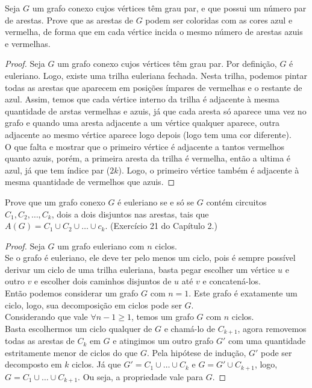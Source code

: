 \documentclass[12pt]{article}
\newenvironment{problem}[2][Ex]{\begin{trivlist}
\item[\hskip \labelsep {\bfseries #1}\hskip \labelsep {\bfseries #2.}]}{\end{trivlist}}
\begin{document}
\begin{problem}{E9}
Seja $G$ um grafo conexo cujos vértices têm grau par, e que possui um número par de arestas. Prove que as arestas de $G$ podem ser coloridas com as cores azul e vermelha, de forma que em cada vértice incida o mesmo número de arestas azuis e vermelhas.
\end{problem}

\begin{proof}
Seja $G$ um grafo conexo cujos vértices têm grau par. Por definição, $G$ é euleriano. Logo, existe uma trilha euleriana fechada. Nesta trilha, podemos pintar todas as arestas que aparecem em posições ímpares de vermelhas e o restante de azul. Assim, temos que cada vértice interno da trilha é adjacente à mesma quantidade de arstas vermelhas e azuis, já que cada aresta só aparece uma vez no grafo e quando uma aresta adjacente a um vértice qualquer aparece, outra adjacente ao mesmo vértice aparece logo depois (logo tem uma cor diferente). \\
O que falta e mostrar que o primeiro vértice é adjacente a tantos vermelhos quanto azuis, porém, a primeira aresta da trilha é vermelha, então a ultima é azul, já que tem índice par ($2k$). Logo, o primeiro vértice também é adjacente à mesma quantidade de vermelhos que azuis.
\end{proof}

\begin{problem}{E10}
Prove que um grafo conexo $G$ é euleriano se e só se $G$ contém circuitos $C_1, C_2, \dots, C_k$, dois a dois disjuntos nas arestas, tais que $A(G) = C_1 \cup C_2 \cup \dots \cup c_k$. (Exercício 21 do Capítulo 2.)
\end{problem}

\begin{proof}
Seja $G$ um grafo euleriano com $n$ ciclos. \\
Se o grafo é euleriano, ele deve ter pelo menos um ciclo, pois é sempre possível derivar um ciclo de uma trilha euleriana, basta pegar escolher um vértice $u$ e outro $v$ e escolher dois caminhos disjuntos de $u$ até $v$ e concatená-los. \\
Então podemos considerar um grafo $G$ com $n = 1$. Este grafo é exatamente um ciclo, logo, sua decomposição em ciclos pode ser $G$. \\
Considerando que vale $\forall n - 1 \geq 1$, temos um grafo $G$ com $n$ ciclos. \\
Basta escolhermos um ciclo qualquer de $G$ e chamá-lo de $C_{k+1}$, agora removemos todas as arestas de $C_k$ em $G$ e atingimos um outro grafo $G'$ com uma quantidade estritamente menor de ciclos do que $G$. Pela hipótese de indução, $G'$ pode ser decomposto em $k$ ciclos. Já que $G' = C_1 \cup \dots \cup C_k$ e $G = G' \cup C_{k+1}$, logo, $G = C_1 \cup \dots \cup C_{k+1}$. Ou seja, a propriedade vale para $G$.
\end{proof}
\end{document}

